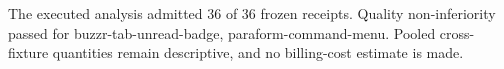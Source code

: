 The executed analysis admitted 36 of 36 frozen receipts. Quality non-inferiority passed for buzzr-tab-unread-badge, paraform-command-menu. Pooled cross-fixture quantities remain descriptive, and no billing-cost estimate is made.
